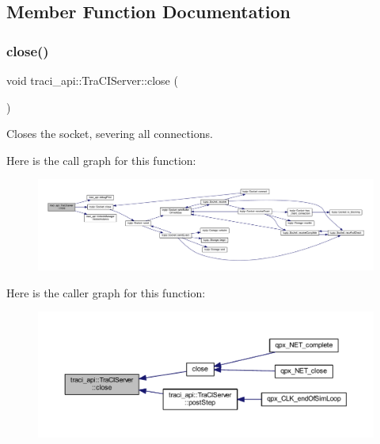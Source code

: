 \subsection{Member Function Documentation}
\mbox{\label{classtraci__api_1_1_tra_c_i_server_a1fd920907cde7ef5a10d078aec34080a}} 
\subsubsection{\texorpdfstring{close()}{close()}}
{\footnotesize\ttfamily void traci\+\_\+api\+::\+Tra\+C\+I\+Server\+::close (\begin{DoxyParamCaption}{ }\end{DoxyParamCaption})}



Closes the socket, severing all connections. 

Here is the call graph for this function\+:
\nopagebreak
\begin{figure}[H]
\begin{center}
\leavevmode
\includegraphics[width=350pt]{classtraci__api_1_1_tra_c_i_server_a1fd920907cde7ef5a10d078aec34080a_cgraph}
\end{center}
\end{figure}
Here is the caller graph for this function\+:
\nopagebreak
\begin{figure}[H]
\begin{center}
\leavevmode
\includegraphics[width=350pt]{classtraci__api_1_1_tra_c_i_server_a1fd920907cde7ef5a10d078aec34080a_icgraph}
\end{center}
\end{figure}
\mbox{\label{classtraci__api_1_1_tra_c_i_server_af4814a9a99d79f4e00fc102169d10cc2}} 

